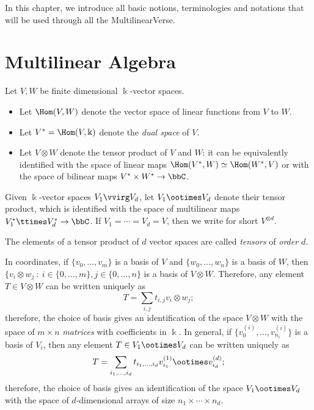 In this chapter, we introduce all basic notions, terminologies and notations that will be used through all the MultilinearVerse. 

\section{Multilinear Algebra}
\label{introduction-section-representingtensors}

\begin{definition}
\label{introduction-definition-tensor_product}
Let $V,W$ be finite dimensional $\Bbbk$-vector spaces.
\begin{itemize}
    \item Let $\Hom(V,W)$ denote the vector space of linear functions from $V$ to $W$.
    \item Let $V^* = \Hom(V,\Bbbk)$ denote the \emph{dual space} of $V$.
    \item Let $V \otimes W$ denote the tensor product of $V$ and $W$: it can be equivalently identified with the space of linear maps $\Hom(V^*,W) \simeq \Hom(W^*,V)$ or with the space of bilinear maps $V^* \times W^* \to \bbC$.
\end{itemize}
Given $\Bbbk$-vector spaces $V_1 \vvirg V_d$, let $V_1 \ootimes V_d$ denote their tensor product, which is identified with the space of multilinear maps $V_1^* \ttimes V_d^* \to \bbC$. If $V_1 = \cdots = V_d = V$, then we write for short $V^{\otimes d}$. 

The elements of a tensor product of $d$ vector spaces are called \emph{tensors} of \emph{order $d$}.

In coordinates, if $\{v_0,\ldots,v_m\}$ is a basis of $V$ and $\{w_0,\ldots,w_n\}$ is a basis of $W$, then $\{v_i \otimes w_j ~:~ i \in \{0,\ldots,m\}, j \in \{0,\ldots,n\}$ is a basis of $V\otimes W$. Therefore, any element $T \in V\otimes W$ can be written uniquely as 
\[
    T = \sum_{i,j} t_{i,j}v_i\otimes w_j;
\]
therefore, the choice of basis gives an identification of the space $V\otimes W$ with the space of $m\times n$ \emph{matrices} with coefficients in $\Bbbk$. In general, if $\{v_0^{(i)},\ldots,v_{n_i}^{(i)}\}$ is a basis of $V_i$, then any element $T \in V_1 \ootimes V_d$ can be written uniquely as 
\[
    T = \sum_{i_1,\ldots,i_d} t_{i_1,\ldots,i_d}v_{i_1}^{(1)}\ootimes v_{i_d}^{(d)};
\]
therefore, the choice of basis gives an identification of the space $V_1 \ootimes V_d$ with the space of $d$-dimensional arrays of size $n_1 \times\cdots\times n_d$. 
\end{definition}

